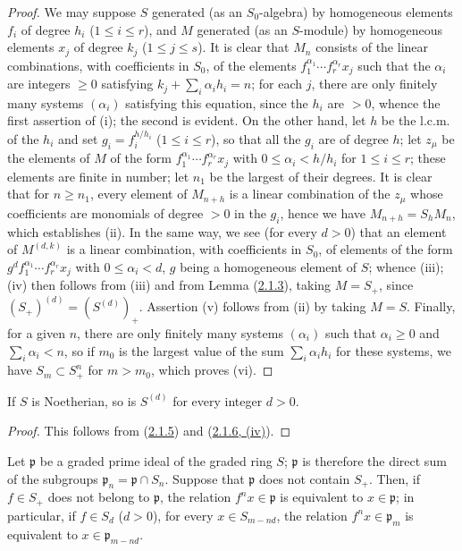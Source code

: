 \begin{proof}
We may suppose $S$ generated (as an $S_0$-algebra) by homogeneous
elements $f_i$ of degree $h_i$ ($1\leq i\leq r$), and $M$ generated (as
an $S$-module) by homogeneous elements $x_j$ of degree $k_j$
($1\leq j\leq s$). It is clear that $M_n$ consists of the linear
combinations, with coefficients in $S_0$, of the elements
$f_1^{\alpha_1}\cdots f_r^{\alpha_r}x_j$ such that the $\alpha_i$ are
integers $\geq 0$ satisfying $k_j+\sum_i\alpha_i h_i=n$; for each $j$,
there are only finitely many systems $(\alpha_i)$ satisfying this equation,
since the $h_i$ are $>0$, whence the first assertion of (i); the second
is evident. On the other hand, let $h$ be the l.c.m. of the $h_i$ and set
$g_i=f_i^{h/h_i}$ ($1\leq i\leq r$), so that all the $g_i$ are of
degree $h$; let $z_\mu$ be the elements of $M$ of the form
$f_1^{\alpha_1}\cdots f_r^{\alpha_r}x_j$ with
$0\leq\alpha_i<h/h_i$ for $1\leq i\leq r$; these elements are finite in
number; let $n_1$ be the largest of their degrees. It is clear that for
$n\geq n_1$, every element of $M_{n+h}$ is a linear combination of the
$z_\mu$ whose coefficients are monomials of degree $>0$ in the $g_i$,
hence we have $M_{n+h}=S_hM_n$, which establishes (ii). In the same way, we
see (for every $d>0$) that an element of $M^{(d,k)}$ is a linear
combination, with coefficients in $S_0$, of elements of the form
$g^df_1^{\alpha_1}\cdots f_r^{\alpha_r}x_j$ with
$0\leq\alpha_i<d$, $g$ being a homogeneous element of $S$; whence (iii); (iv)
then follows from (iii) and from Lemma (\hyperref[II.2.1.3]{2.1.3}),
taking $M=S_+$, since $(S_+)^{(d)}=(S^{(d)})_+$. Assertion (v)
follows from (ii) by taking $M=S$. Finally, for a given $n$, there are only
finitely many systems $(\alpha_i)$ such that $\alpha_i\geq 0$ and
$\sum_i\alpha_i<n$, so if $m_0$ is the largest value of the sum
$\sum_i\alpha_i h_i$ for these systems, we have $S_m\subset S_+^n$ for
$m>m_0$, which proves (vi).
\end{proof}

\begin{corollary}[2.1.7]
\label{II.2.1.7}
If $S$ is Noetherian, so is $S^{(d)}$ for every integer
$d>0$.
\end{corollary}

\begin{proof}
This follows from (\hyperref[II.2.1.5]{2.1.5}) and
(\hyperref[II.2.1.6]{2.1.6, (iv)}).
\end{proof}

\begin{env}[2.1.8]
\label{II.2.1.8}
Let $\mathfrak{p}$ be a graded prime ideal of the graded ring $S$;
$\mathfrak{p}$ is therefore the direct sum of the subgroups
$\mathfrak{p}_n=\mathfrak{p}\cap S_n$. Suppose that $\mathfrak{p}$ does not
contain $S_+$. Then, if $f\in S_+$ does not belong to
$\mathfrak{p}$, the relation $f^nx\in\mathfrak{p}$ is equivalent to
$x\in\mathfrak{p}$; in particular, if $f\in S_d$ ($d>0$), for every
$x\in S_{m-nd}$, the relation $f^nx\in\mathfrak{p}_m$ is equivalent to
$x\in\mathfrak{p}_{m-nd}$.
\end{env}

